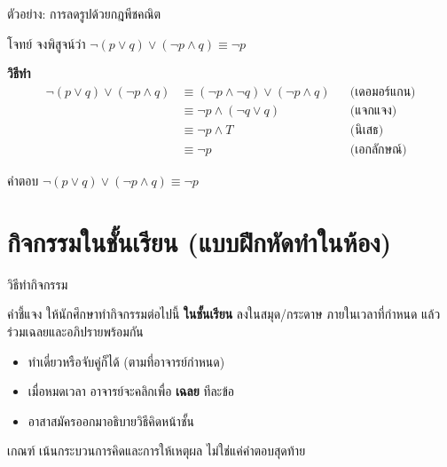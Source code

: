 \begin{frame}{ตัวอย่าง: การลดรูปด้วยกฎพีชคณิต}
  \begin{block}{โจทย์}
    จงพิสูจน์ว่า $\neg(p \lor q) \lor (\neg p \land q) \equiv \neg p$
  \end{block}
  \vspace{0.3em}
  \textbf{วิธีทำ}
  \begin{align*}
    \neg(p \lor q) \lor (\neg p \land q)
      &\equiv (\neg p \land \neg q) \lor (\neg p \land q) && \text{(เดอมอร์แกน)} \\
      &\equiv \neg p \land (\neg q \lor q) && \text{(แจกแจง)} \\
      &\equiv \neg p \land T && \text{(นิเสธ)} \\
      &\equiv \neg p && \text{(เอกลักษณ์)}
  \end{align*}
  \begin{exampleblock}{คำตอบ}
    $\neg(p \lor q) \lor (\neg p \land q) \equiv \neg p$
  \end{exampleblock}
\end{frame}




\section{กิจกรรมในชั้นเรียน (แบบฝึกหัดทำในห้อง)}

\begin{frame}{วิธีทำกิจกรรม}
  \begin{block}{คำชี้แจง}
    ให้นักศึกษาทำกิจกรรมต่อไปนี้ \textbf{ในชั้นเรียน} ลงในสมุด/กระดาษ
    ภายในเวลาที่กำหนด แล้วร่วมเฉลยและอภิปรายพร้อมกัน
  \end{block}
  \vspace{0.5em}
  \begin{itemize}
    \item ทำเดี่ยวหรือจับคู่ก็ได้ (ตามที่อาจารย์กำหนด)
    \item เมื่อหมดเวลา อาจารย์จะคลิกเพื่อ \textbf{เฉลย} ทีละข้อ
    \item อาสาสมัครออกมาอธิบายวิธีคิดหน้าชั้น
  \end{itemize}
  \vspace{0.5em}
  \begin{exampleblock}{เกณฑ์}
    เน้นกระบวนการคิดและการให้เหตุผล ไม่ใช่แค่คำตอบสุดท้าย
  \end{exampleblock}
\end{frame}

